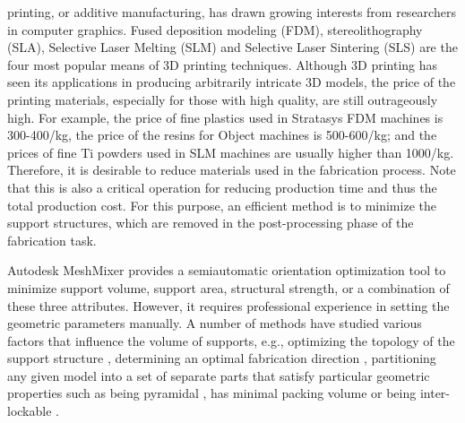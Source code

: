 


 printing, or additive manufacturing, has drawn growing interests from researchers in computer graphics. Fused deposition modeling (FDM), stereolithography (SLA), Selective Laser Melting (SLM) and Selective Laser Sintering (SLS) are the four most popular means of 3D printing techniques. Although 3D printing has seen its applications in producing arbitrarily intricate 3D models, the price of the printing materials, especially for those with high quality, are still outrageously high. {\color{blue} For example, the price of fine plastics used in Stratasys FDM machines is 300-400\textdollar /kg, the price of the resins for Object machines is 500-600\textdollar /kg; and the prices of fine Ti powders used in SLM machines are usually higher than 1000\textdollar /kg.} Therefore, it is desirable to reduce materials used in the fabrication process. Note that this is also a critical operation for reducing production time and thus the total production cost. For this purpose, an efficient method is to minimize the support structures, which are removed in the post-processing phase of the fabrication task.

Autodesk MeshMixer provides a semiautomatic orientation optimization tool to minimize support volume, support area, structural strength, or a combination of these three attributes. However, it requires professional experience in setting the geometric parameters manually. A number of methods have studied various factors that influence the volume of supports, e.g., optimizing the topology of the support structure \cite{DumasHL14,VanekGB14}, determining an optimal fabrication direction \cite{Zhang:2015,HildebrandBA13,padhye2011multi}, partitioning any given model into a set of separate parts that satisfy particular geometric properties such as being pyramidal \cite{Hu_siga14}, has minimal packing volume \cite{VanekGBMCSM14} or being inter-lockable \cite{SongFLF15}.



